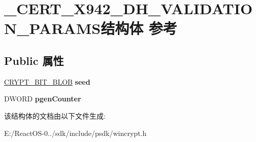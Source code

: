 \hypertarget{struct___c_e_r_t___x942___d_h___v_a_l_i_d_a_t_i_o_n___p_a_r_a_m_s}{}\section{\+\_\+\+C\+E\+R\+T\+\_\+\+X942\+\_\+\+D\+H\+\_\+\+V\+A\+L\+I\+D\+A\+T\+I\+O\+N\+\_\+\+P\+A\+R\+A\+M\+S结构体 参考}
\label{struct___c_e_r_t___x942___d_h___v_a_l_i_d_a_t_i_o_n___p_a_r_a_m_s}
\subsection*{Public 属性}
\begin{DoxyCompactItemize}
\item 
\mbox{\label{struct___c_e_r_t___x942___d_h___v_a_l_i_d_a_t_i_o_n___p_a_r_a_m_s_a6665fefba5a97227c6f64407d9036880}} 
\hyperlink{struct___c_r_y_p_t___b_i_t___b_l_o_b}{C\+R\+Y\+P\+T\+\_\+\+B\+I\+T\+\_\+\+B\+L\+OB} {\bfseries seed}
\item 
\mbox{\label{struct___c_e_r_t___x942___d_h___v_a_l_i_d_a_t_i_o_n___p_a_r_a_m_s_acd599b0d53818eea3c3d8517127892e3}} 
D\+W\+O\+RD {\bfseries pgen\+Counter}
\end{DoxyCompactItemize}


该结构体的文档由以下文件生成\+:\begin{DoxyCompactItemize}
\item 
E\+:/\+React\+O\+S-\/0../sdk/include/psdk/wincrypt.\+h\end{DoxyCompactItemize}
